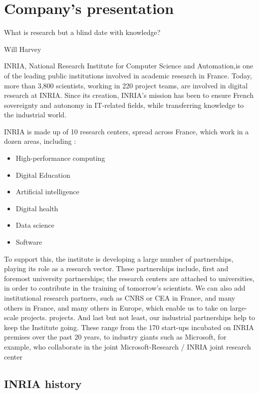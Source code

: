 \chapter{Company's presentation}
\label{chap:inria}

\epigraph{What is research but a blind date with knowledge?}{Will Harvey}
INRIA, National Research Institute for Computer Science and Automation,is one of the leading public institutions involved in academic research in France. Today, more than 3,800 scientists, working in 220 project teams, are involved in digital research at INRIA. Since its creation, INRIA's mission has been to ensure French sovereignty and autonomy in IT-related fields, while transferring knowledge to the industrial world. 

INRIA is made up of 10 research centers, spread across France, which
work in a dozen areas, including :
\begin{multicols}{2}
\begin{itemize}
    \item High-performance computing
    \item Digital Education
    \item Artificial intelligence
    \item Digital health
    \item Data science
    \item Software
\end{itemize}
\end{multicols}

To support this, the institute is developing a large number of partnerships, playing its role as a research vector. These partnerships include, first and foremost university partnerships; the research centers are attached to universities, in order to contribute in the training of tomorrow's scientists. We can also add institutional research partners, such as CNRS or CEA in France, and many others in France, and many others in Europe, which enable us to take on large-scale projects. projects. And last but not least, our industrial partnerships help to keep the Institute going. These range from the 170 start-ups incubated on INRIA premises over the past 20 years, to industry giants such as Microsoft, for example, who collaborate in the joint Microsoft-Research / INRIA joint research center\cite{inria_microsoft}

\section{INRIA history}

